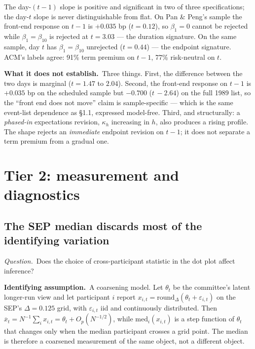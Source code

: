 \documentclass[11pt]{article}
\newcommand{\qq}[1]{\vspace{0.3em}\noindent\textit{Question.}\ #1}
\newcommand{\ia}[1]{\vspace{0.4em}\noindent\textbf{Identifying assumption.}\ #1}
\newcommand{\limn}[1]{\vspace{0.4em}\noindent\textbf{What it does not establish.}\ #1}
\begin{document}
\noindent The day-$(t\!-\!1)$ slope is positive and significant in two of three specifications; the day-$t$ slope is never distinguishable from flat. On Pan \& Peng's sample the front-end response on $t\!-\!1$ is $+0.035$ bp ($t=0.12$), so $\beta_1=0$ cannot be rejected while $\beta_1=\beta_{10}$ is rejected at $t=3.03$ --- the duration signature. On the same sample, day $t$ has $\beta_1=\beta_{10}$ unrejected ($t=0.44$) --- the endpoint signature. ACM's labels agree: 91\% term premium on $t\!-\!1$, 77\% risk-neutral on $t$.

\limn{Three things. First, the difference between the two days is marginal ($t=1.47$ to $2.04$). Second, the front-end response on $t\!-\!1$ is $+0.035$ bp on the scheduled sample but $-0.700$ ($t\,{-}2.64$) on the full 1989 list, so the ``front end does not move'' claim is sample-specific --- which is the same event-list dependence as \S1.1, expressed model-free. Third, and structurally: a \emph{phased-in} expectations revision, $\kappa_h$ increasing in $h$, also produces a rising profile. The shape rejects an \emph{immediate} endpoint revision on $t\!-\!1$; it does not separate a term premium from a gradual one.}

\section{Tier 2: measurement and diagnostics}

\subsection{The SEP median discards most of the identifying variation}

\qq{Does the choice of cross-participant statistic in the dot plot affect inference?}

\ia{A coarsening model. Let $\theta_t$ be the committee's latent longer-run view and let participant $i$ report
$x_{i,t}=\mathrm{round}_{\Delta}\!\left(\theta_t+\varepsilon_{i,t}\right)$ on the SEP's $\Delta=0.125$ grid, with $\varepsilon_{i,t}$ iid and continuously distributed. Then $\overline{x}_t=N^{-1}\sum_i x_{i,t}=\theta_t+O_p(N^{-1/2})$, while $\mathrm{med}_i(x_{i,t})$ is a step function of $\theta_t$ that changes only when the median participant crosses a grid point. The median is therefore a coarsened measurement of the same object, not a different object.}
\end{document}
